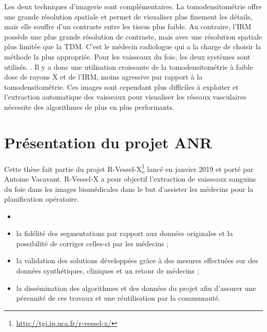 Les deux techniques d'imagerie sont complémentaires. La tomodensitométrie offre une grande résolution spatiale et permet de visualiser plus finement les détails, mais elle souffre d'un contraste entre les tissus plus faible. Au contraire, l'IRM possède une plus grande résolution de contraste, mais avec une résolution spatiale plus limitée que la TDM. C'est le médecin radiologue qui a la charge de choisir la méthode la plus appropriée. Pour les vaisseaux du foie, les deux systèmes sont utilisés. . Il y a donc une utilisation croissante de la tomodensitométrie à faible dose de rayons X et de l'IRM, moins agressive par rapport à la tomodensitométrie. Ces images sont cependant plus difficiles à exploiter et l'extraction automatique des vaisseaux pour visualiser les réseaux vasculaires nécessite des algorithmes de plus en plus performants.


\section{Présentation du projet ANR}
\label{sec:introduction:objectifs}

Cette thèse fait partie du projet R-Vessel-X\footnote{\url{http://tgi.ip.uca.fr/r-vessel-x/}} lancé en janvier 2019 et porté par Antoine Vacavant. R-Vessel-X a pour objectif l'extraction de vaisseaux sanguins du foie dans les images biomédicales dans le but d'assister les médecins pour la planification opératoire. 

\begin{itemize}
\item {}
\item la fidélité des segmentations par rapport aux données originales et la possibilité de corriger celles-ci par les médecins ;
\item la validation des solutions développées grâce à des mesures effectuées sur des données synthétiques, cliniques et un retour de médecins ;
\item la dissémination des algorithmes et des données du projet afin d'assurer une pérennité de ces travaux et une réutilisation par la communauté.
\end{itemize}

